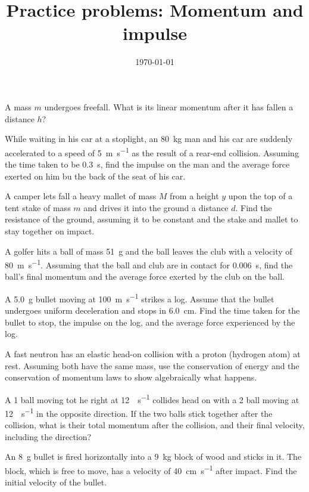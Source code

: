 \documentclass [hw]{exam}
\title{Practice problems: Momentum and impulse}
\author{\mobeardInstructorShort}
\date{\today}
\begin{document}
\maketitle

\begin{questions}
\question A mass $m$ undergoes freefall. What is its linear momentum after it has fallen a distance $h$?

\question While waiting in his car at a stoplight, an \SI{80}{\kilo\gram} man and his car are suddenly accelerated to a speed of \SI{5}{\meter\per\second} as the result of a rear-end collision. Assuming the time taken to be \SI{0.3}{\second}, find the impulse on the man and the average force exerted on him bu the back of the seat of his car. 

\question A camper lets fall a heavy mallet of mass $M$ from a height $y$ upon the top of a tent stake of mass $m$ and drives it into the ground a distance $d$. Find the resistance of the ground, assuming it to be constant and the stake and mallet to stay together on impact. 

\question A golfer hits a ball of mass \SI{51}{\gram} and the ball leaves the club with a velocity of \SI{80}{\meter\per\second}. Assuming that the ball and club are in contact for \SI{0.006}{\second}, find the ball's final momentum and the average force exerted by the club on the ball. 

\question A \SI{5.0}{\gram} bullet moving at \SI{100}{\meter\per\second} strikes a log. Assume that the bullet undergoes uniform deceleration and stops in \SI{6.0}{\centi\meter}. Find the time taken for the bullet to stop, the impulse on the log, and the average force experienced by the log. 

\question A fast neutron has an elastic head-on collision with a proton (hydrogen atom) at rest. Assuming both have the same mass, use the conservation of energy and the conservation of momentum laws to show algebraically what happens.

\question A \SI{1}{\pound} ball moving tot he right at \SI{12}{\foot\per\second} collides head on with a \SI{2}{\pound} ball moving at \SI{12}{\foot\per\second} in the opposite direction. If the two balls stick together after the collision, what is their total momentum after the collision, and their final velocity, including the direction? 

\question An \SI{8}{\gram} bullet is fired horizontally into a \SI{9}{\kilo\gram} block of wood and sticks in it. The block, which is free to move, has a velocity of \SI{40}{\centi\meter\per\second} after impact. Find the initial velocity of the bullet. 


\end{questions}
\end{document}
